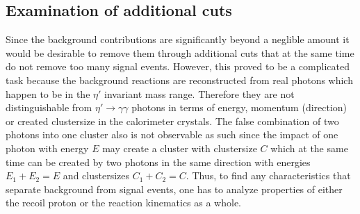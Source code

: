 \subsection{Examination of additional cuts}
\label{subsec:addcuts}
Since the background contributions are significantly beyond a neglible amount it would be desirable to remove them through additional cuts that at the same time do not remove too many signal events. However, this proved to be a complicated task because the background reactions are reconstructed from real photons which happen to be in the $\eta'$ invariant mass range. Therefore they are not distinguishable from $\eta'\to\gamma\gamma$ photons in terms of energy, momentum (direction) or created clustersize in the calorimeter crystals. The false combination of two photons into one cluster also is not observable as such since the impact of one photon with energy $E$ may create a cluster with clustersize $C$ which at the same time can be created by two photons in the same direction with energies $E_1+E_2=E$ and clustersizes $C_1+C_2=C$. Thus, to find any characteristics that separate background from signal events, one has to analyze properties of either the recoil proton or the reaction kinematics as a whole.
